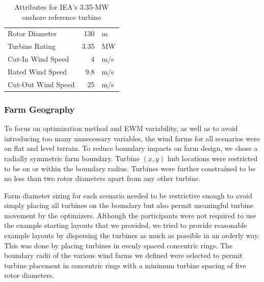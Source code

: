 	\begin{table}[H]
		\begin{center}
			\caption{Attributes for IEA's 3.35-MW onshore reference turbine}
			\label{tab:335MW}
			\begin{tabular}{@{}lrl@{}}
			\toprule
				Rotor Diameter & 130 & m \\ 
				Turbine Rating & 3.35 & MW \\ 
				Cut-In Wind Speed & 4 & m/s \\ 
				Rated Wind Speed & 9.8 & m/s \\ 
				Cut-Out Wind Speed & 25 & m/s \\
			\bottomrule
			\end{tabular}
		\end{center}
	\end{table}
	
\subsubsection{Farm Geography}\label{sec:farmgeog}

	To focus on optimization method and EWM variability, as well as to avoid introducing too many unnecessary variables, the wind farms for all scenarios were on flat and level terrain.
	To reduce boundary impacts on farm design, we chose a radially symmetric farm boundary.
	Turbine $(x, y)$ hub locations were restricted to be on or within the boundary radius.
	Turbines were further constrained to be no less than two rotor diameters apart from any other turbine.

	Farm diameter sizing for each scenario needed to be restrictive enough to avoid simply placing all turbines on the boundary but also permit meaningful turbine movement by the optimizers.
	Although the participants were not required to use the example starting layouts that we provided, we tried to provide reasonable example layouts by dispersing the turbines as much as possible in an orderly way. This was done by placing turbines in evenly spaced concentric rings. The boundary radii of the various wind farms we defined were selected to permit turbine placement in concentric rings with a minimum turbine spacing of five rotor diameters.


